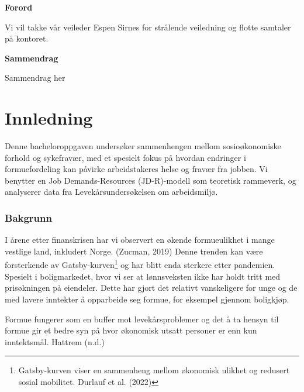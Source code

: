 \documentclass[
  12pt,
  a4paper,
  DIV=11,
  numbers=noendperiod]{scrartcl}
\renewcommand*\contentsname{Table of contents}
\newcommand\contentsname{Table of contents}
\begin{document}




\thispagestyle{plain}
\begin{center}
    \Large
    \textbf{Forord}
\end{center}

Vi vil takke vår veileder Espen Sirnes for strålende veiledning og
flotte samtaler på kontoret.

\newpage
\hypersetup{linkcolor=black}
\renewcommand{\contentsname}{Innholdsfortegnelse}
\renewcommand*{\figureautorefname}{Figur}
\renewcommand*{\tableautorefname}{Tabell}
\renewcommand*{\equationautorefname}{Ligning:}
\tableofcontents
\listoffigures
\listoftables
\hypersetup{linkcolor=blue}
\newpage
\thispagestyle{plain}
\begin{center}
    \Large
    \textbf{Sammendrag}
\end{center}

Sammendrag her

\newpage

\section{Innledning}\label{innledning}

Denne bacheloroppgaven undersøker sammenhengen mellom sosioøkonomiske
forhold og sykefravær, med et spesielt fokus på hvordan endringer i
formuefordeling kan påvirke arbeidstakeres helse og fravær fra jobben.
Vi benytter en Job Demands-Resources (JD-R)-modell som teoretisk
rammeverk, og analyserer data fra Levekårsundersøkelsen om arbeidsmiljø.

\subsubsection{Bakgrunn}\label{bakgrunn}

I årene etter finanskrisen har vi observert en økende formueulikhet i
mange vestlige land, inkludert Norge. (Zucman, 2019) Denne trenden kan
være forsterkende av Gatsby-kurven\footnote{Gatsby-kurven viser en
  sammenheng mellom økonomisk ulikhet og redusert sosial mobilitet.
  Durlauf et al. (2022)} og har blitt enda sterkere etter pandemien.
Spesielt i boligmarkedet, hvor vi ser at lønnsveksten ikke har holdt
tritt med prisøkningen på eiendeler. Dette har gjort det relativt
vanskeligere for unge og de med lavere inntekter å opparbeide seg
formue, for eksempel gjennom boligkjøp.

Formue fungerer som en buffer mot levekårsproblemer og det å ta hensyn
til formue gir et bedre syn på hvor økonomisk utsatt personer er enn kun
inntektsmål. Hattrem (n.d.)
\end{document}
